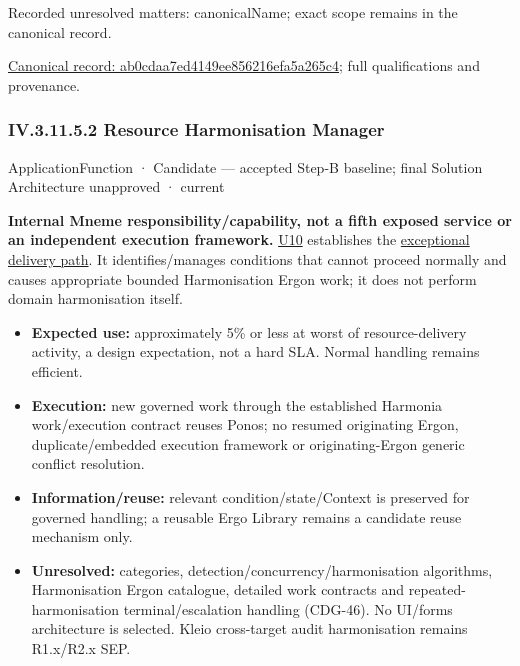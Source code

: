 {\small Recorded unresolved matters: canonicalName; exact scope remains in the canonical record.}\par
{\footnotesize \href{../../../../../../../continuum/application/application-function/ab0cdaa7ed4149ee856216efa5a265c4.md}{Canonical record: ab0cdaa7ed4149ee856216efa5a265c4}; full qualifications and provenance.}\par
\subsubsection*{IV.3.11.5.2 Resource Harmonisation Manager}
\label{navigation:IV.3.11.5.2}

\label{element:a6580e0b9f0f40c9a33d731d20110057}
{\small ApplicationFunction · Candidate — accepted Step-B baseline; final Solution Architecture unapproved · current}\par

\textbf{Internal Mneme responsibility/capability, not a fifth exposed service or an
independent execution framework.} \href{\detokenize{../../../../../../../../docs/markdown/05-information-systems-architecture/sources.md#u10}}{U10} establishes the
\hyperref[element:a6580e0b9f0f40c9a33d731d20110057]{exceptional delivery path}.
It identifies/manages conditions that cannot proceed normally and causes appropriate
bounded Harmonisation Ergon work; it does not perform domain harmonisation itself.



\begin{itemize}


\item \textbf{Expected use:} approximately 5\% or less at worst of resource-delivery activity,
  a design expectation, not a hard SLA. Normal handling remains efficient.

\item \textbf{Execution:} new governed work through the established Harmonia work/execution
  contract reuses Ponos; no resumed originating Ergon, duplicate/embedded execution
  framework or originating-Ergon generic conflict resolution.

\item \textbf{Information/reuse:} relevant condition/state/Context is preserved for governed
  handling; a reusable Ergo Library remains a candidate reuse mechanism only.

\item \textbf{Unresolved:} categories, detection/concurrency/harmonisation algorithms,
  Harmonisation Ergon catalogue, detailed work contracts and repeated-harmonisation
  terminal/escalation handling (CDG-46). No UI/forms architecture is selected.
  Kleio cross-target audit harmonisation remains R1.x/R2.x SEP.

\end{itemize}

